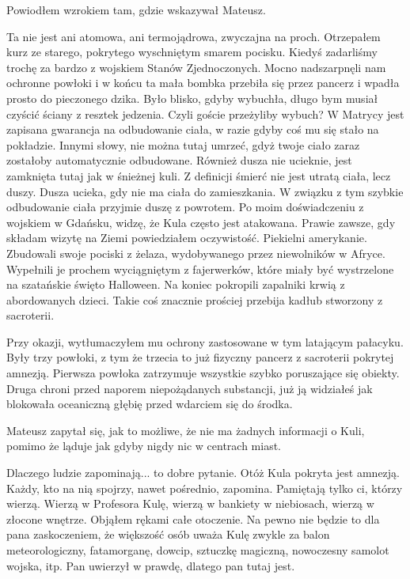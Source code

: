 
Powiodłem wzrokiem tam, gdzie wskazywał Mateusz.
\begin{dialogue}
\ds{} Ta nie jest ani atomowa, ani termojądrowa, zwyczajna na proch. \dm{} Otrzepałem kurz ze starego, pokrytego wyschniętym smarem pocisku. \dm{} 
Kiedyś zadarliśmy trochę za bardzo z wojskiem Stanów Zjednoczonych. 
Mocno nadszarpnęli nam ochronne powłoki i w końcu ta mała bombka przebiła się przez pancerz i wpadła prosto do pieczonego dzika.
Było blisko, gdyby wybuchła, długo bym musiał czyścić ściany z resztek jedzenia.
\ds{} Czyli goście przeżyliby wybuch?
\ds{} W Matrycy jest zapisana gwarancja na odbudowanie ciała, w razie gdyby coś mu się stało na pokładzie. 
Innymi słowy, nie można tutaj umrzeć, gdyż twoje ciało zaraz zostałoby automatycznie odbudowane.
Również dusza nie ucieknie, jest zamknięta tutaj jak w śnieżnej kuli.
Z definicji śmierć nie jest utratą ciała, lecz duszy. Dusza ucieka, gdy nie ma ciała do zamieszkania. W związku z tym szybkie odbudowanie ciała przyjmie duszę z powrotem.
\ds{} Po moim doświadczeniu z wojskiem w Gdańsku, widzę, że Kula często jest atakowana.
\ds{} Prawie zawsze, gdy składam wizytę na Ziemi \dm{} powiedziałem oczywistość. \dm{} Piekielni amerykanie. 
Zbudowali swoje pociski z żelaza, wydobywanego przez niewolników w Afryce.
Wypełnili je prochem wyciągniętym z fajerwerków, które miały być wystrzelone na szatańskie święto Halloween. 
Na koniec pokropili zapalniki krwią z abordowanych dzieci.
Takie coś znacznie prościej przebija kadłub stworzony z sacroterii.
\end{dialogue}

Przy okazji, wytłumaczyłem mu ochrony zastosowane w tym latającym pałacyku. 
Były trzy powłoki, z tym że trzecia to już fizyczny pancerz z sacroterii pokrytej amnezją.
Pierwsza powłoka zatrzymuje wszystkie szybko poruszające się obiekty.
Druga chroni przed naporem niepożądanych substancji, już ją widziałeś jak blokowała oceaniczną głębię przed wdarciem się do środka.

Mateusz zapytał się, jak to możliwe, że nie ma żadnych informacji o Kuli, pomimo że ląduje jak gdyby nigdy nic w centrach miast.
\begin{dialogue}
\ds{} Dlaczego ludzie zapominają... to dobre pytanie.
Otóż Kula pokryta jest amnezją. Każdy, kto na nią spojrzy, nawet pośrednio, zapomina.
Pamiętają tylko ci, którzy wierzą. 
Wierzą w Profesora Kulę, wierzą w bankiety w niebiosach, wierzą w złocone wnętrze.
\dm{} Objąłem rękami całe otoczenie. \dm{} 
Na pewno nie będzie to dla pana zaskoczeniem, że większość osób uważa Kulę zwykle za balon meteorologiczny, fatamorganę, dowcip, sztuczkę magiczną, nowoczesny samolot wojska, itp.
Pan uwierzył w prawdę, dlatego pan tutaj jest.
\end{dialogue}

